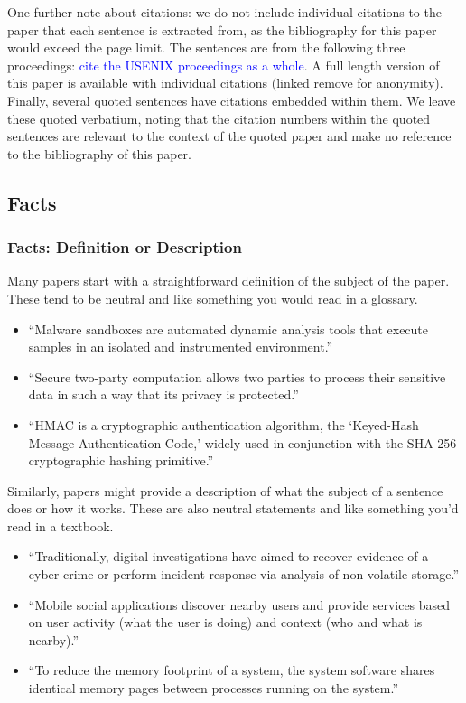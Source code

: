 \documentclass[sigconf,anonymous]{acmart}
\newcommand{\textblue}[1]{\textcolor{blue}{#1}}
\begin{document}
	One further note about citations: we do not include individual citations to the paper that each sentence is extracted from, as the bibliography for this paper would exceed the page limit. The sentences are from the following three proceedings: \textblue{cite the USENIX proceedings as a whole}. A full length version of this paper is available with individual citations (linked remove for anonymity). Finally, several quoted sentences have citations embedded within them. We leave these quoted verbatium, noting that the citation numbers within the quoted sentences are relevant to the context of the quoted paper and make no reference to the bibliography of this paper. 
	
	
	\subsection{Facts}
	\subsubsection{Facts: Definition or Description}
	
	Many papers start with a straightforward definition of the subject of the paper. These tend to be neutral and like something you would read in a glossary.
	
	\begin{itemize}
		
		\item	``Malware sandboxes are automated dynamic analysis tools that execute samples in an isolated and instrumented environment.''
		
		\item	``Secure two-party computation allows two parties to process their sensitive data in such a way that its privacy is protected.''
		
		\item	``HMAC is a cryptographic authentication algorithm, the ‘Keyed-Hash Message Authentication Code,’ widely used in conjunction with the SHA-256 cryptographic hashing primitive.''
		
	\end{itemize} 
	
	Similarly, papers might provide a description of what the subject of a sentence does or how it works. These are also neutral statements and like something you’d read in a textbook. 
	
	\begin{itemize}
		
		\item	``Traditionally, digital investigations have aimed to recover evidence of a cyber-crime or perform incident response via analysis of non-volatile storage.''
		
		\item	``Mobile social applications discover nearby users and provide services based on user activity (what the user is doing) and context (who and what is nearby).''
		
		\item	``To reduce the memory footprint of a system, the system software shares identical memory pages between processes running on the system.''
	\end{itemize} 	
\end{document}
